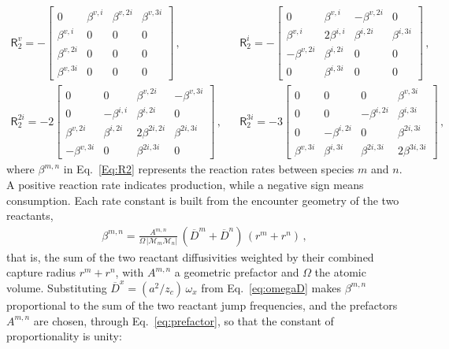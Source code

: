 \documentclass{article}
\newcommand{\spmat}[1]{\bm{\mathsf{#1}}}   %
\begin{document}
\begin{align}\label{Eq:R2} 
    {\spmat{R}}^{v}_{2} = -
\begin{bmatrix} 
0 & \beta^{v,i} & \beta^{v,2i} & \beta^{v,3i} \\ 
\beta^{v,i}  & 0 & 0 & 0 \\
\beta^{v,2i} & 0  & 0 & 0 \\
\beta^{v,3i} & 0 & 0 & 0
\end{bmatrix}\,, &&
%
    {\spmat{R}}^i_2 = -
\begin{bmatrix} 
0 & \beta^{v,i}  & -\beta^{v,2i} & 0 \\ 
\beta^{v,i}  & 2\beta^{i,i} & \beta^{i,2i} & {\beta^{i,3i}} \\
-\beta^{v,2i} & \beta^{i,2i}  & 0 & 0 \\
0 & {\beta^{i,3i}} & 0 & 0
\end{bmatrix}\,, \nonumber \\ 
%
%
    {\spmat{R}}^{2i}_{2} = -{2}
\begin{bmatrix} 
0 & 0  & \beta^{v,2i} & -\beta^{v,3i}  \\ 
0  & -\beta^{i,i} & \beta^{i,2i} & 0 \\
\beta^{v,2i} & \beta^{i,2i}  & {2\beta^{2i,2i}} & {\beta^{2i,3i}} \\
-\beta^{v,3i}  & 0 & {\beta^{2i,3i}} & 0
\end{bmatrix}\,,  &&
%
%
    {\spmat{R}}^{3i}_{2} = -{3}
\begin{bmatrix} 
0 & 0  & 0 & \beta^{v,3i}  \\ 
0  & 0 & -\beta^{i,2i} & {\beta^{i,3i}} \\
0 & -\beta^{i,2i}  & 0 & {\beta^{2i,3i}} \\
\beta^{v,3i}  & {\beta^{i,3i}} & {\beta^{2i,3i}} & {2\beta^{3i,3i}}
\end{bmatrix} \,,
\end{align}
where $\beta^{m,n}$ in Eq.~\eqref{Eq:R2} represents the reaction rates between species $m$ and $n$. 
A positive reaction rate indicates production, while a negative sign means consumption. Each rate constant is built from the encounter geometry of the two reactants,
\begin{align}\label{eq:betageom}
    \beta^{m,n} = \frac{A^{m,n}}{\Omega\,{|\mathcal{M}_m \mathcal{M}_n|}}\,(\overline{D}^{m} + \overline{D}^{n})\,(r^{m} + r^{n}) \,,
\end{align}
that is, the sum of the two reactant diffusivities weighted by their combined capture radius $r^m+r^n$, with $A^{m,n}$ a geometric prefactor and $\Omega$ the atomic volume. Substituting $\overline{D}^{x}=(a^2/z_c)\,\omega_x$ from Eq.~\eqref{eq:omegaD} makes $\beta^{m,n}$ proportional to the sum of the two reactant jump frequencies, and the prefactors $A^{m,n}$ are chosen, through Eq.~\eqref{eq:prefactor}, so that the constant of proportionality is unity:
\end{document}
